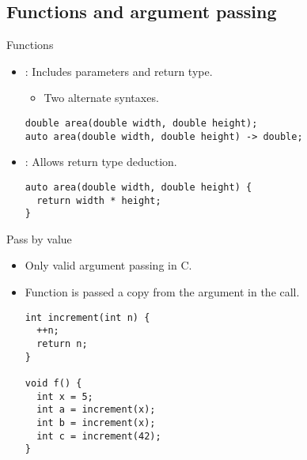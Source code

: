\subsection{Functions and argument passing}

\begin{frame}[t,fragile]{Functions}
\begin{itemize}
  \item {}: Includes parameters and return type.
    \begin{itemize}
      \item Two alternate syntaxes.
    \end{itemize}
\begin{lstlisting}
double area(double width, double height);
auto area(double width, double height) -> double;
\end{lstlisting}

  \vfill
  \item {}: Allows return type deduction.
\begin{lstlisting}
auto area(double width, double height) {
  return width * height;
}
\end{lstlisting}
\end{itemize}
\end{frame}

\begin{frame}[t,fragile]{Pass by value}
\begin{itemize}
  \item Only valid argument passing in C.
  \item Function is passed a copy from the argument in the call.
\begin{lstlisting}
int increment(int n) {
  ++n;
  return n;
}

void f() {
  int x = 5;
  int a = increment(x);
  int b = increment(x);
  int c = increment(42);
}
\end{lstlisting}
\end{itemize}
\end{frame}

